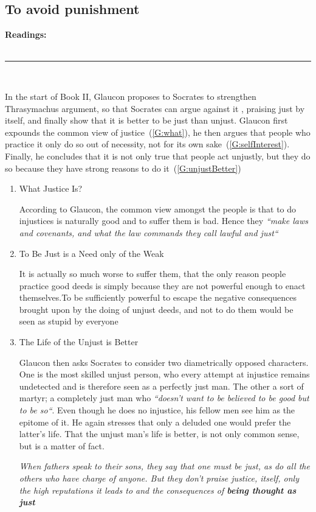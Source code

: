 \documentclass[english,course]{Notes}
\newcommand{\ita}[1]{\textit{#1}}
\newcommand\readings{\textbf{Readings:} \\}
\newcommand\sep{\\ \noindent\rule{10cm}{0.8pt} \\}
\newcommand\quo[1]{\begin{displayquote}\ita{\large{#1}}\end{displayquote}}
\begin{document}
\newpage
\subsection{To avoid punishment}
\readings \cite{PlatoRepublicII}
\sep
{}

\par{In the start of Book II, Glaucon proposes to Socrates  to strengthen Thrasymachus argument, so that Socrates can argue against it , praising just by itself, and finally show that it is better to be just than unjust. Glaucon first expounds the common view of justice~(\ref{G:what}), he then argues that people who practice it only do so out of necessity, not for its own sake~(\ref{G:selfInterest}). Finally, he concludes that it is not only true that people act unjustly, but they do so because they have strong reasons to do it~(\ref{G:unjustBetter})}

\begin{enumerate}

    \item{What Justice Is?~\label{G:what}}
        \par{According to Glaucon, the common view amongst the people is that to do injustices is naturally good and to suffer them is bad. Hence they \ita{``make laws and covenants, and what the law commands they call lawful and just``}}
        
    \item{To Be Just is a Need only of the Weak~\label{G:selfInterest}}
        \par{It is actually so much worse to suffer them, that the only reason people practice good deeds is simply because they are not powerful enough to enact themselves.To be sufficiently powerful to escape the negative consequences brought upon by the doing of unjust deeds, and not to do them would be seen as stupid by everyone~}
     
    \item{The Life of the Unjust is Better~\label{G:unjustBetter}}
        \par{Glaucon then asks Socrates to consider two diametrically opposed characters. One is the most skilled unjust person, who every attempt at injustice remains undetected and is therefore seen as a perfectly just man. The other a sort of martyr; a completely just man who \ita{``doesn't want to be believed to be good but to be so``}. Even though he does no injustice, his fellow men see him as the epitome of it. He again stresses that only a deluded one would prefer the latter's life. That the unjust man's life is better, is not only common sense, but is a matter of fact.
        
        \quo{When fathers speak to their sons, they say that one must be just, as do all the others who have charge of anyone. But they don't praise justice, itself, only the high reputations it leads to and the consequences of \textbf{being thought as just}}}
    
\end{enumerate}
\end{document}
